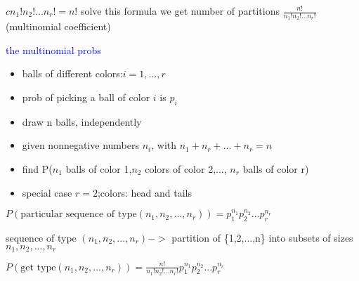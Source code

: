 $cn_1!n_2!...n_r!=n!$ solve this formula we get number of partitions $\frac{n!}{n_1!n_2!...n_r!}$(multinomial coefficient)

\textcolor{blue}{the multinomial probs}

\begin{itemize}
    \item balls of different colors:$i=1,...,r$
    \item prob of picking a ball of color $i$ is $p_i$
    \item draw n balls, independently
    \item given nonnegative numbers $n_i$, with $n_1+n_r+...+n_r=n$
    \item find P($n_1$ balls of color 1,$n_2$ colors of color 2,..., $n_r$ balls of color r)
    \item special case $r=2$;colors: head and tails
\end{itemize}

$P(\text{particular sequence of type}(n_1,n_2,...,n_r))=p_1^{n_1}p_2^{n_2}...p_r^{n_r}$

sequence of type $(n_1,n_2,...,n_r)->$ partition of \{1,2,...,n\} into subsets of sizes $n_1,n_2,...,n_r$

$P(\text{get type}(n_1,n_2,...,n_r))=\frac{n!}{n_1!n_2!...n_r!}p_1^{n_1}p_2^{n_2}...p_r^{n_r}$


